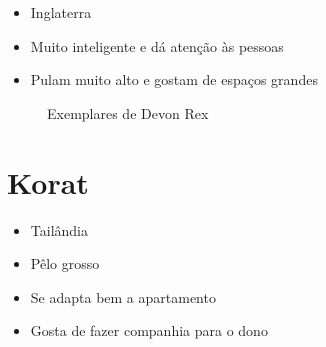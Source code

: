\documentclass[a4paper]{article}
\begin{document}
  \begin{itemize}
    \item Inglaterra
    \item Muito inteligente e d\'a aten\c{c}\~ao \`as pessoas
    \item Pulam muito alto e gostam de espa\c{c}os grandes
  \end{itemize}

  \begin{figure}[ht]
    \centering


    \caption{Exemplares de Devon Rex}
    \label{fig:devon-rex}
  \end{figure}

  \section{Korat}

  \begin{itemize}
    \item Tail\^andia
    \item P\^elo grosso
    \item Se adapta bem a apartamento
    \item Gosta de fazer companhia para o dono
  \end{itemize}
\end{document}
